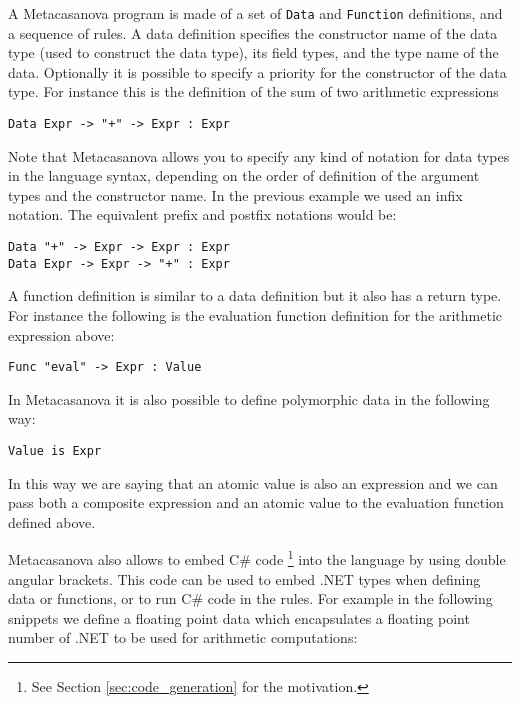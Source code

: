 A Metacasanova program is made of a set of \texttt{Data} and \texttt{Function} definitions, and a sequence of rules. A data definition specifies the constructor name of the data type (used to construct the data type), its field types, and the type name of the data. Optionally it is possible to specify a priority for the constructor of the data type. For instance this is the definition of the sum of two arithmetic expressions

\begin{lstlisting}
Data Expr -> "+" -> Expr : Expr
\end{lstlisting}

\noindent
Note that Metacasanova allows you to specify any kind of notation for data types in the language syntax, depending on the order of definition of the argument types and the constructor name. In the previous example we used an infix notation. The equivalent prefix and postfix notations would be:

\begin{lstlisting}
Data "+" -> Expr -> Expr : Expr
Data Expr -> Expr -> "+" : Expr
\end{lstlisting}

\noindent
A function definition is similar to a data definition but it also has a return type. For instance the following is the evaluation function definition for the arithmetic expression above:

\begin{lstlisting}
Func "eval" -> Expr : Value
\end{lstlisting}

\noindent
In Metacasanova it is also possible to define polymorphic data in the following way:

\begin{lstlisting}
Value is Expr
\end{lstlisting}

\noindent
In this way we are saying that an atomic value is also an expression and we can pass both a composite expression and an atomic value to the evaluation function defined above.

Metacasanova also allows to embed C\# code \footnote{See Section \ref{sec:code_generation} for the motivation.} into the language by using double angular brackets. This code can be used to embed .NET types when defining data or functions, or to run C\# code in the rules. For example in the following snippets we define a floating point data which encapsulates a floating point number of .NET to be used for arithmetic computations:

